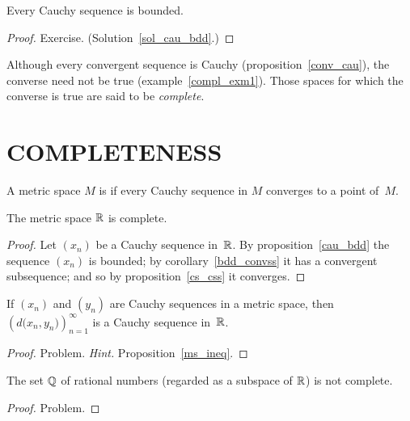 \begin{prop}\label{cau_bdd} Every Cauchy sequence is bounded.
\end{prop}

\begin{proof} Exercise.   (Solution~\ref{sol_cau_bdd}.)  \ns  \end{proof}

Although every convergent sequence is Cauchy (proposition~\ref{conv_cau}), the converse need
not be true (example~\ref{compl_exm1}). Those spaces for which the converse is true are said
to be \emph{complete}.







\section{COMPLETENESS}
\begin{defn} A metric space $M$ is
 if every Cauchy sequence in $M$ converges to a point of~$M$.
\end{defn}

\begin{exam}\label{r_compl} The metric space $\mathbb{R}$ is complete.
\end{exam}

\begin{proof} Let $(x_n)$ be a Cauchy sequence in~$\mathbb{R}$.  By proposition~\ref{cau_bdd}
the sequence $(x_n)$ is bounded; by corollary~\ref{bdd_convss} it has a convergent
subsequence; and so by proposition~\ref{cs_css} it converges.
\end{proof}

\begin{exam} If $(x_n)$ and $(y_n)$ are Cauchy sequences in a metric space, then
$\left(d\bigl(x_n,y_n\bigr)\right)_{n=1}^\infty$ is a Cauchy sequence in~$\mathbb{R}$.
\end{exam}

\begin{proof}  Problem. \emph{Hint.}  Proposition~\ref{ms_ineq}.
\ns \end{proof}

\begin{exam} The set $\mathbb{Q}$ of rational numbers (regarded as a subspace of $\mathbb{R}$) is not complete.
\end{exam}

\begin{proof} Problem.  \ns  \end{proof}

